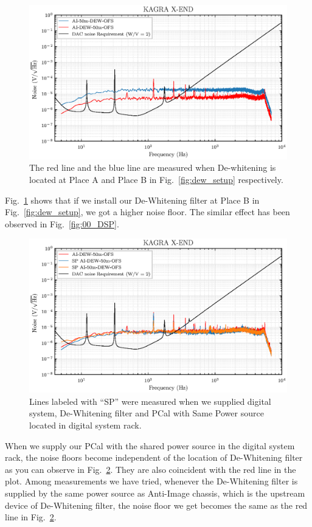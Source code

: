 \begin{figure}[hbt!]
\centering
\includegraphics[width=1\textwidth]{figure/noise/01_AvsB}
\caption[Noise]{ The red line and the blue line are measured when De-whitening is located at Place A and Place B in Fig.~\ref{fig:dew_setup} respectively.}
\label{fig:01_AvsB}
\end{figure}

Fig.~\ref{fig:01_AvsB} shows that if we install our De-Whitening filter at Place B in Fig.~\ref{fig:dew_setup}, we got a higher noise floor. The similar effect has been observed in Fig.~\ref{fig:00_DSP}. 

\pagebreak

\begin{figure}[hbt!]
\centering
\includegraphics[width=1\textwidth]{figure/noise/01_SP}
\caption[Noise]{ Lines labeled with ``SP'' were measured when we supplied digital system, De-Whitening filter and PCal with Same Power source located in digital system rack. }
\label{fig:01_SP}
\end{figure}

When we supply our PCal with the shared power source in the digital system rack, the noise floors become independent of the location of De-Whitening filter as you can observe in Fig.~\ref{fig:01_SP}. They are also coincident with the red line in the plot. Among measurements we have tried, whenever the De-Whitening filter is supplied by the same power source as Anti-Image chassis, which is the upstream device of De-Whitening filter, the noise floor we get becomes the same as the red line in Fig.~\ref{fig:01_SP}.
